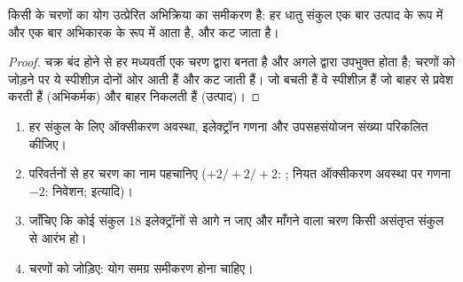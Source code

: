 \begin{proposition}\label{prop:b2:catalytic-cycles:cycle-sum}
किसी  के चरणों का योग उत्प्रेरित अभिक्रिया का समीकरण है:
हर धातु संकुल एक बार उत्पाद के रूप में और एक बार अभिकारक के रूप में आता है, और कट जाता है।
\end{proposition}

\begin{proof}
चक्र बंद होने से हर मध्यवर्ती एक चरण द्वारा बनता है और अगले द्वारा उपभुक्त होता है;
चरणों को जोड़ने पर ये स्पीशीज़ दोनों ओर आती हैं और कट जाती हैं। जो बचती हैं वे
स्पीशीज़ हैं जो बाहर से प्रवेश करती हैं (अभिकर्मक) और बाहर निकलती हैं (उत्पाद)।
\end{proof}

\begin{method}[चक्र को पढ़ना]\label{met:b2:catalytic-cycles:read-cycle}
\begin{enumerate}
  \item हर संकुल के लिए ऑक्सीकरण अवस्था, इलेक्ट्रॉन गणना और
        उपसहसंयोजन संख्या परिकलित कीजिए।
  \item परिवर्तनों से हर चरण का नाम पहचानिए ($+2/+2/+2$: ; नियत ऑक्सीकरण अवस्था पर
        गणना $-2$: निवेशन; इत्यादि)।
  \item जाँचिए कि कोई संकुल 18 इलेक्ट्रॉनों से आगे न जाए और  माँगने वाला चरण
        किसी असंतृप्त संकुल से आरंभ हो।
  \item चरणों को जोड़िए: योग समग्र समीकरण होना चाहिए।
\end{enumerate}
\end{method}

